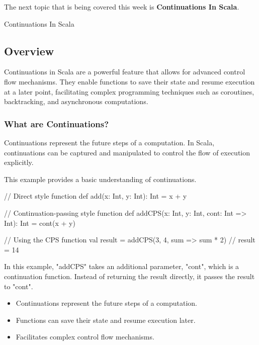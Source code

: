 The next topic that is being covered this week is \textbf{Continuations In Scala}.

\begin{notes}{Continuations In Scala}
    \subsection*{Overview}

    Continuations in Scala are a powerful feature that allows for advanced control flow mechanisms. They enable functions to save their state and resume execution at a later point, facilitating 
    complex programming techniques such as coroutines, backtracking, and asynchronous computations.
    
    \subsubsection*{What are Continuations?}
    
    Continuations represent the future steps of a computation. In Scala, continuations can be captured and manipulated to control the flow of execution explicitly.
    
    \begin{highlight}
    
        This example provides a basic understanding of continuations.
    
    \begin{code}[Scala]
    // Direct style function
    def add(x: Int, y: Int): Int = x + y
    
    // Continuation-passing style function
    def addCPS(x: Int, y: Int, cont: Int => Int): Int = cont(x + y)
    
    // Using the CPS function
    val result = addCPS(3, 4, sum => sum * 2)  // result = 14
    \end{code}
    
        In this example, "addCPS" takes an additional parameter, "cont", which is a continuation function. Instead of returning the result directly, it passes the result to "cont".
    
        \begin{itemize}
            \item Continuations represent the future steps of a computation.
            \item Functions can save their state and resume execution later.
            \item Facilitates complex control flow mechanisms.
        \end{itemize}
    

\end{highlight}
\end{notes}
